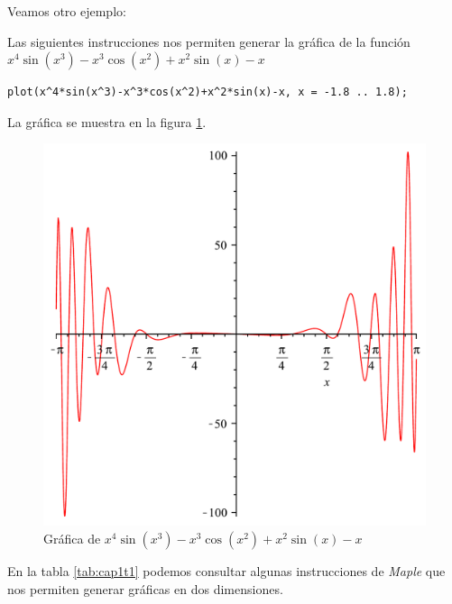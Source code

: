 \begin{bibunit}[plain]
\pagebreak

Veamos otro ejemplo:

Las siguientes instrucciones nos permiten generar la gráfica de la función 
$\displaystyle {x}^{4}\sin \left( {x}^{3} \right) -{x}^{3}\cos \left( {x}^{2}
 \right) +{x}^{2}\sin \left( x \right) -x$

\begin{verbatim}
plot(x^4*sin(x^3)-x^3*cos(x^2)+x^2*sin(x)-x, x = -1.8 .. 1.8);
\end{verbatim}

La gráfica se muestra en la figura \ref{cap1f2}.

\begin{figure}[h!]
\centering
\includegraphics[scale=0.5]{grafica02}
\caption{Gráfica de ${x}^{4}\sin \left( {x}^{3} \right) -{x}^{3}\cos \left( {x}^{2}
 \right) +{x}^{2}\sin \left( x \right) -x$}\label{cap1f2}
\end{figure}

En la tabla \ref{tab:cap1t1} podemos consultar algunas instrucciones de \emph{Maple} que nos
permiten generar gráficas en dos dimensiones. \cite{Lamport}


\end{bibunit}
